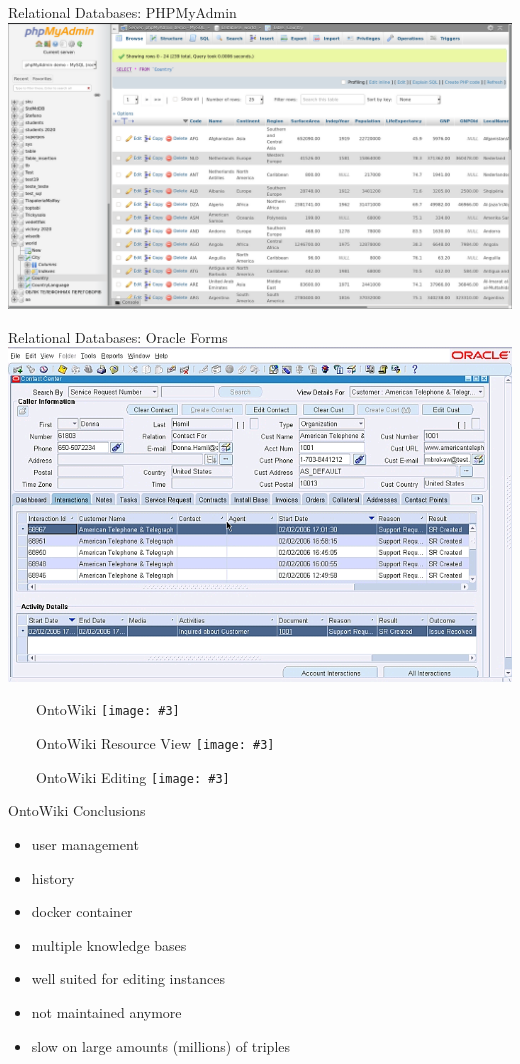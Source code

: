 \documentclass[aspectratio=1610]{beamer}
\newcommand{\imageslide}[4][]
{
\begin{frame}[plain]{~~~~#2}
\vspace{0.2em}
\centering\texttt{[image: \#3]}
\\#1
\note{#4}
\end{frame}
}
\begin{document}
\begin{frame}{Relational Databases: PHPMyAdmin}
\centering
\includegraphics[width=0.9\paperwidth]{img/phpmyadmin.png}
\end{frame}

\begin{frame}{Relational Databases: Oracle Forms}
\centering
\includegraphics[width=0.7\paperwidth]{img/oracleforms.png}
\end{frame}

\imageslide{OntoWiki}{img/ontowiki.png}{}{}
\imageslide{OntoWiki Resource View}{img/ontowiki-ceo.png}{}{}
\imageslide{OntoWiki Editing}{img/ontowiki-ceo-edit.png}{}{}

\begin{frame}{OntoWiki Conclusions}
\centering
\begin{itemize}
\item user management
\item history
\item docker container
\item multiple knowledge bases
\item well suited for editing instances 
\item not maintained anymore
\item slow on large amounts (millions) of triples
\end{itemize}
\end{frame}
\end{document}

